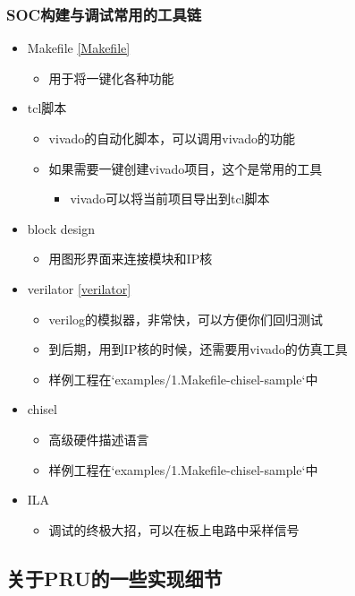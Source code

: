 \documentclass[lang=cn,11pt,a4paper]{elegantpaper}
\begin{document}
\subsubsection{SOC构建与调试常用的工具链}
\begin{itemize}
\item Makefile \ref{Makefile}
  \begin{itemize}
  \item 用于将一键化各种功能
  \end{itemize}
\item tcl脚本
  \begin{itemize}
  \item vivado的自动化脚本，可以调用vivado的功能
  \item 如果需要一键创建vivado项目，这个是常用的工具
    \begin{itemize}
    \item vivado可以将当前项目导出到tcl脚本
    \end{itemize}
  \end{itemize}
\item block design
  \begin{itemize}
  \item 用图形界面来连接模块和IP核
  \end{itemize}
\item verilator \ref{verilator}
  \begin{itemize}
  \item verilog的模拟器，非常快，可以方便你们回归测试
  \item 到后期，用到IP核的时候，还需要用vivado的仿真工具
  \item 样例工程在`examples/1.Makefile-chisel-sample`中
  \end{itemize}
\item chisel
  \begin{itemize}
  \item 高级硬件描述语言
  \item 样例工程在`examples/1.Makefile-chisel-sample`中
  \end{itemize}
\item ILA
  \begin{itemize}
  \item 调试的终极大招，可以在板上电路中采样信号
  \end{itemize}
\end{itemize}

\subsection{关于PRU的一些实现细节}
\end{document}
